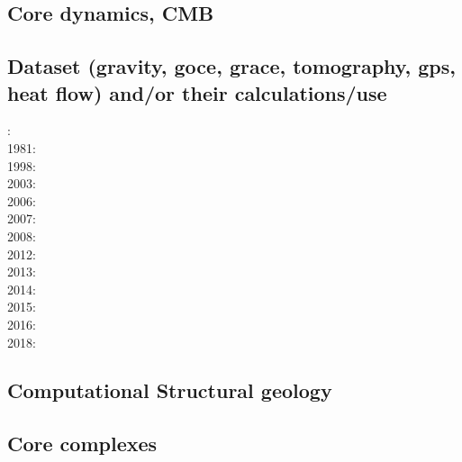 \subsection*{Core dynamics, CMB}

\noindent
\cite{hayu96}
\cite{lahb08}\cite{gost08}

\subsection*{Dataset (gravity, goce, grace, tomography, gps, heat flow) 
and/or their calculations/use}

: \cite{rola77}\\
1981: \cite{dzan81}\\
1998: \cite{bisp98}\\
2003: \cite{krhh03}\cite{sosi03}\\
2006: \cite{masr06}\\
2007: \cite{mitk07}\\
2008: \cite{zhou08}\cite{zhou08}\\
2012: \cite{hawj12}\cite{resa12}\cite{hawj12}\cite{fesw12}\\
2013: \cite{ress13}\cite{ebbf13}\cite{davi13}\\
2014: \cite{paml14}\cite{ebbf14}\cite{krbk14}\\
2015: \cite{boem15}\cite{brrs15}\\
2016: \cite{kord16}\cite{moek16}\\
2018: \cite{pabn18}


\subsection*{Computational Structural geology}

\noindent
\cite{fige95}
\cite{acgf00}
\cite{trla00}
\cite{masc01}
\cite{manc08}
\cite{frem11}
\cite{naam17}


\subsection*{Core complexes}

\noindent
\cite{lehm12}

